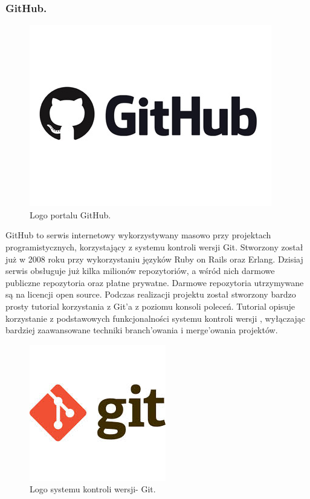 \documentclass[a4paper,12pt]{article}		%
\begin{document}
\subsubsection{GitHub.}

\begin{figure}[h!]
\centering
\includegraphics[scale=0.6]{Resources/GitHub_Logo.jpg}
\caption{Logo portalu GitHub.} 
\end{figure}

GitHub to serwis internetowy wykorzystywany masowo przy projektach programistycznych, korzystający z systemu kontroli wersji Git. Stworzony został już w 2008 roku przy wykorzystaniu języków Ruby on Rails oraz Erlang. Dzisiaj serwis obsługuje już kilka milionów repozytoriów, a wśród nich darmowe publiczne repozytoria oraz płatne prywatne. Darmowe repozytoria utrzymywane są na licencji open source. Podczas realizacji projektu został stworzony bardzo prosty tutorial korzystania z Git'a z poziomu konsoli poleceń. Tutorial opisuje korzystanie z podstawowych funkcjonalności systemu kontroli wersji , wyłączając bardziej zaawansowane techniki branch'owania i merge'owania projektów.

\begin{figure}[h!]
\centering
\includegraphics[scale=0.4]{Resources/Git_Logo.jpg}
\caption{Logo systemu kontroli wersji- Git.} 
\end{figure} 
\end{document}
